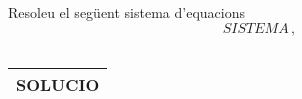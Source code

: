 \begin{enunciat}
Resoleu el següent sistema d'equacions
\[
  SISTEMA\,,
\]
\end{enunciat}

\begin{quadricula}
\begin{tabular}{|C{5cm}{0.5cm}|}
\hline
  \\
\hline
\end{tabular}
\end{quadricula}

\begin{solucio}
\begin{center}
\begin{tabular}{|C{5cm}{0.5cm}|}
\hline
SOLUCIO \\
\hline
\end{tabular}
\end{center}
\end{solucio}
